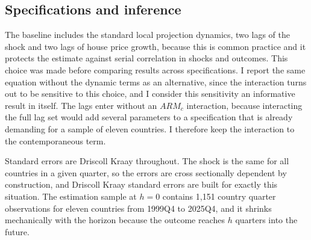 \subsection{Specifications and inference}

The baseline includes the standard local projection dynamics, two lags of
the shock and two lags of house price growth, because this is common
practice and it protects the estimate against serial correlation in shocks
and outcomes. This choice was made before comparing results across
specifications. I report the same equation without the dynamic terms as an
alternative, since the interaction turns out to be sensitive to this choice,
and I consider this sensitivity an informative result in itself. The lags
enter without an $ARM_c$ interaction, because interacting the full lag set
would add several parameters to a specification that is already demanding
for a sample of eleven countries. I therefore keep the interaction to the
contemporaneous term.

Standard errors are Driscoll Kraay \citep{driscoll1998} throughout. The
shock is the same for all countries in a given quarter, so the errors are
cross sectionally dependent by construction, and Driscoll Kraay standard
errors are built for exactly this situation. The estimation sample at $h = 0$ contains 1{,}151
country quarter observations for eleven countries from 1999Q4 to 2025Q4, and
it shrinks mechanically with the horizon because the outcome reaches $h$
quarters into the future.
